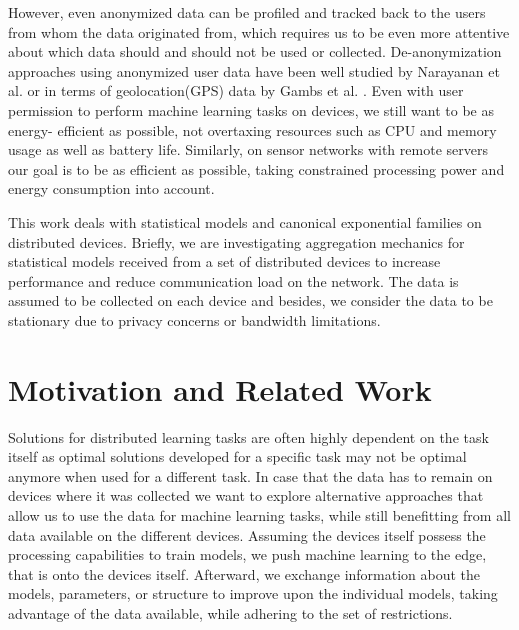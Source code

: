 However, even anonymized data can be profiled and tracked back to the users from whom the data originated from, which requires us to be even more attentive about which data should and should not be used or collected. 
De-anonymization approaches using anonymized user data have been well studied by Narayanan et al. \cite{narayanan2008robust} or in terms of geolocation(GPS) data by Gambs et al. \cite{gambs2014anonymization}.
Even with user permission to perform machine learning tasks on devices, we still want to be as energy- efficient as possible, not overtaxing resources such as CPU and memory usage as well as battery life.
Similarly, on sensor networks with remote servers our goal is to be as efficient as possible, taking constrained processing power and energy consumption into account.

This work deals with statistical models and canonical exponential families on distributed devices.
Briefly, we are investigating aggregation mechanics for statistical models received from a set of distributed devices to increase performance and reduce communication load on the network.
The data is assumed to be collected on each device and besides, we consider the data to be stationary due to privacy concerns or bandwidth limitations.

\section{Motivation and Related Work}
 
Solutions for distributed learning tasks are often highly dependent on the task itself as optimal solutions developed for a specific task may not be optimal anymore when used for a different task.
In case that the data has to remain on devices where it was collected we want to explore alternative approaches that allow us to use the data for machine learning tasks, while still benefitting from all data available on the different devices.
Assuming the devices itself possess the processing capabilities to train models, we push machine learning to the edge, that is onto the devices itself.
Afterward, we exchange information about the models, parameters, or structure to improve upon the individual models, taking advantage of the data available, while adhering to the set of restrictions.

